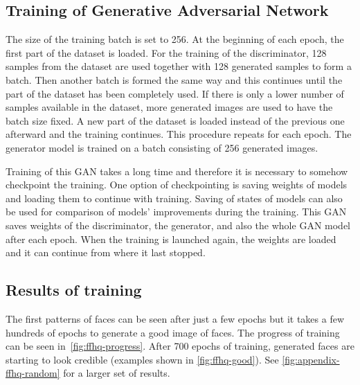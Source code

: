 \subsection*{Training of Generative Adversarial Network}
The size of the training batch is set to 256. At the beginning of each epoch, the first part of the dataset is loaded. For the training of the discriminator, 128 samples from the dataset are used together with 128 generated samples to form a batch. Then another batch is formed the same way and this continues until the part of the dataset has been completely used. If there is only a lower number of samples available in the dataset, more generated images are used to have the batch size fixed. A new part of the dataset is loaded instead of the previous one afterward and the training continues. This procedure repeats for each epoch. The generator model is trained on a batch consisting of 256 generated images.

Training of this GAN takes a long time and therefore it is necessary to somehow checkpoint the training. One option of checkpointing is saving weights of models and loading them to continue with training. Saving of states of models can also be used for comparison of models' improvements during the training. This GAN saves weights of the discriminator, the generator, and also the whole GAN model after each epoch. When the training is launched again, the weights are loaded and it can continue from where it last stopped.

\subsection*{Results of training}
The first patterns of faces can be seen after just a few epochs but it takes a few hundreds of epochs to generate a good image of faces. The progress of training can be seen in~\autoref{fig:ffhq-progress}. After 700 epochs of training, generated faces are starting to look credible (examples shown in \autoref{fig:ffhq-good}). See \autoref{fig:appendix-ffhq-random} for a larger set of results.

